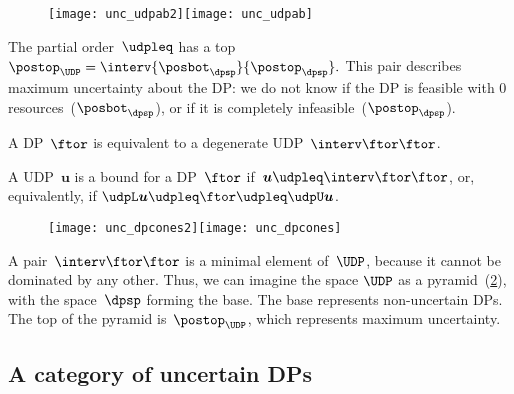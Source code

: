 \begin{figure}[h!]
    \texttt{[image: unc\_udpab2]}\texttt{[image: unc\_udpab]}
    \caption{}
    \label{fig:udpspace}
\end{figure}

The partial order~$\udpleq$ has a top~$\postop_{\UDP}=\interv {\posbot_{\dpsp}} {\postop_{\dpsp}}.
$
This pair describes maximum uncertainty about the DP: we do not know
if the DP is feasible with 0 resources~($\posbot_{\dpsp}$), or if it
is completely infeasible~($\postop_{\dpsp}$).

A DP~$\ftor$ is equivalent to a degenerate UDP~$\interv\ftor\ftor$.

A UDP~$\boldsymbol{u}$ is a bound for a DP~$\ftor$ if~$\boldsymbol{u}\udpleq\interv\ftor\ftor$,
or, equivalently, if $\udpL\boldsymbol{u}\udpleq\ftor\udpleq\udpU\boldsymbol{u}$.

\begin{figure}[h!]
    \texttt{[image: unc\_dpcones2]}\texttt{[image: unc\_dpcones]}
    \caption{}
    \label{fig:pyr1}
\end{figure}

A pair~$\interv\ftor\ftor$ is a minimal element of~$\UDP$, because it cannot be dominated by any other.
Thus, we can imagine the space $\UDP$ as a pyramid~(\cref{fig:pyr1}), with the space~$\dpsp$ forming the base.
The base represents non-uncertain DPs.
The top of the pyramid is~$\postop_{\UDP}$, which represents maximum uncertainty.

%
%

\subsection{A category of uncertain DPs}

